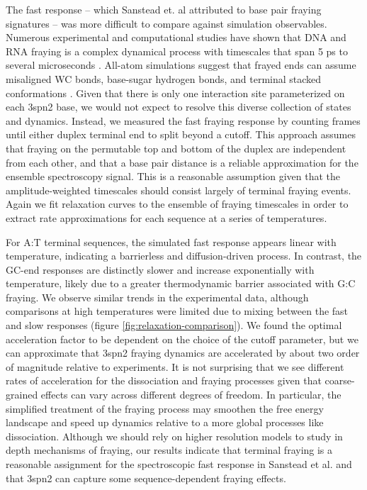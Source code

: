 \documentclass[journal=jpcbfk,manuscript=article]{achemso}
\begin{document}

The fast response -- which Sanstead et. al attributed to base pair fraying signatures -- was more difficult to compare against simulation observables. Numerous experimental and computational studies have shown that DNA and RNA fraying is a complex dynamical process with timescales that span 5 ps to several microseconds \citep{ Nonin1995TerminalFraying, Nikolova2012ProbingSimulations, Andreatta2006UltrafastHelix, Galindo-Murillo2015ConvergenceDGCACGAACGAACGAACGC}. All-atom simulations suggest that frayed ends can assume misaligned WC bonds, base-sugar hydrogen bonds, and terminal stacked conformations \citep{PinamontiTheModels, Zgarbova2014BaseRNA}. Given that there is only one interaction site parameterized on each 3spn2 base, we would not expect to resolve this diverse collection of states and dynamics. Instead, we measured the fast fraying response by counting frames until either duplex terminal end to split beyond a cutoff. This approach assumes that fraying on the permutable top and bottom of the duplex are independent from each other, and that a base pair distance is a reliable approximation for the ensemble spectroscopy signal. This is a reasonable assumption given that the amplitude-weighted timescales should consist largely of terminal fraying events. Again we fit relaxation curves to the ensemble of fraying timescales in order to extract rate approximations for each sequence at a series of temperatures. 

For A:T terminal sequences, the simulated fast response appears linear with temperature, indicating a barrierless and diffusion-driven process. In contrast, the GC-end responses are distinctly slower and increase exponentially with temperature, likely due to a greater thermodynamic barrier associated with G:C fraying. We observe similar trends in the experimental data, although comparisons at high temperatures were limited due to mixing between the fast and slow responses (figure \ref{fig:relaxation-comparison}). We found the optimal acceleration factor to be dependent on the choice of the cutoff parameter, but we can approximate that 3spn2 fraying dynamics are accelerated by about two order of magnitude relative to experiments. It is not surprising that we see different rates of acceleration for the dissociation and fraying processes given that coarse-grained effects can vary across different degrees of freedom. In particular, the simplified treatment of the fraying process may smoothen the free energy landscape and speed up dynamics relative to a more global processes like dissociation. Although we should rely on higher resolution models to study in depth mechanisms of fraying, our results indicate that terminal fraying is a reasonable assignment for the spectroscopic fast response in Sanstead et al. and that 3spn2 can capture some sequence-dependent fraying effects.
\end{document}
